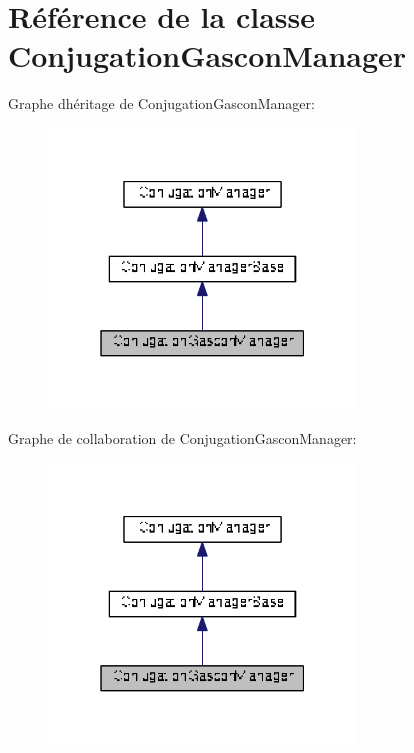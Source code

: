 \hypertarget{class_conjugation_gascon_manager}{}\section{Référence de la classe Conjugation\+Gascon\+Manager}
\label{class_conjugation_gascon_manager}


Graphe d\textquotesingle{}héritage de Conjugation\+Gascon\+Manager\+:
\nopagebreak
\begin{figure}[H]
\begin{center}
\leavevmode
\includegraphics[width=232pt]{class_conjugation_gascon_manager__inherit__graph}
\end{center}
\end{figure}


Graphe de collaboration de Conjugation\+Gascon\+Manager\+:
\nopagebreak
\begin{figure}[H]
\begin{center}
\leavevmode
\includegraphics[width=232pt]{class_conjugation_gascon_manager__coll__graph}
\end{center}
\end{figure}
